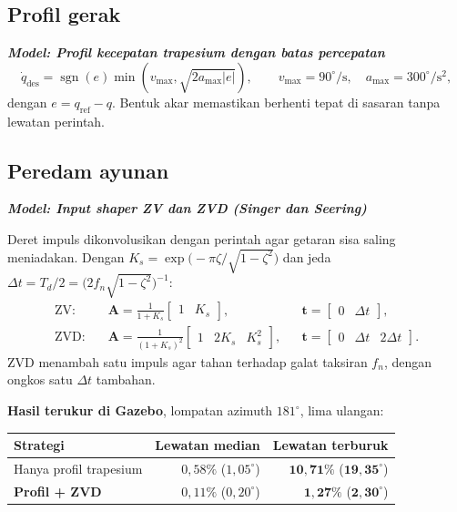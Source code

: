 \documentclass[11pt,a4paper]{article}
\newcommand{\degg}{^\circ}
\newcommand{\model}[1]{\textbf{\textit{Model: #1}}}
\begin{document}
\subsection{Profil gerak}

\model{Profil kecepatan trapesium dengan batas percepatan}
\begin{equation}
\dot q_{\mathrm{des}} = \operatorname{sgn}(e)\min\!\left( v_{\max}, \sqrt{2 a_{\max} |e|} \right),
\qquad v_{\max} = 90\degg/\mathrm{s}, \quad a_{\max} = 300\degg/\mathrm{s^2},
\end{equation}
dengan $e = q_{\mathrm{ref}} - q$. Bentuk akar memastikan berhenti tepat di sasaran tanpa lewatan perintah.

\subsection{Peredam ayunan}

\model{Input shaper ZV dan ZVD (Singer dan Seering)}

Deret impuls dikonvolusikan dengan perintah agar getaran sisa saling meniadakan. Dengan
$K_s = \exp\!\big(-\pi\zeta/\sqrt{1-\zeta^2}\big)$ dan jeda $\Delta t = T_d/2 = \big(2 f_n\sqrt{1-\zeta^2}\big)^{-1}$:
\begin{align}
\text{ZV:}\quad & \bm{A} = \frac{1}{1+K_s}\begin{bmatrix} 1 & K_s \end{bmatrix},
&& \bm{t} = \begin{bmatrix} 0 & \Delta t \end{bmatrix}, \\
\text{ZVD:}\quad & \bm{A} = \frac{1}{(1+K_s)^2}\begin{bmatrix} 1 & 2K_s & K_s^2 \end{bmatrix},
&& \bm{t} = \begin{bmatrix} 0 & \Delta t & 2\Delta t \end{bmatrix}.
\end{align}
ZVD menambah satu impuls agar tahan terhadap galat taksiran $f_n$, dengan ongkos satu $\Delta t$ tambahan.

\textbf{Hasil terukur di Gazebo}, lompatan azimuth $181\degg$, lima ulangan:

\begin{longtable}{l r r}
\toprule
\textbf{Strategi} & \textbf{Lewatan median} & \textbf{Lewatan terburuk} \\
\midrule
Hanya profil trapesium & $0{,}58\%$ ($1{,}05\degg$) & $\bm{10{,}71\%}$ ($\bm{19{,}35\degg}$) \\
\textbf{Profil + ZVD} & $0{,}11\%$ ($0{,}20\degg$) & $\bm{1{,}27\%}$ ($\bm{2{,}30\degg}$) \\
\bottomrule
\end{longtable}
\end{document}
